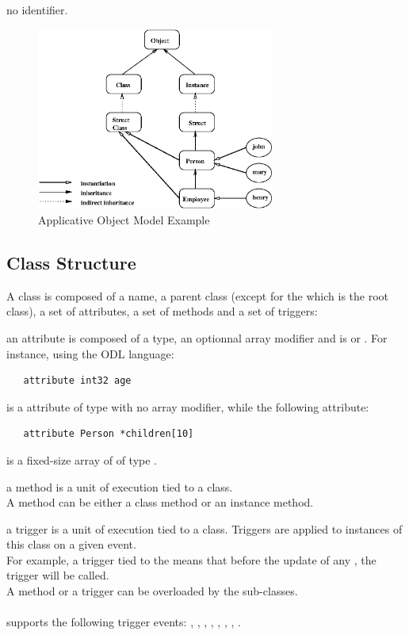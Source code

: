 no identifier.
\ei
\begin{figure}[!th]
\centering
\includegraphics[height=60mm]{figures/objmod2.eps}
\caption{Applicative Object Model Example}
\label{objmod2}
\end{figure}
\subsection{Class Structure}
A class is composed of a name, a parent class (except for the
 which is the root class), a set
of attributes, a set of methods and a set of triggers:
\bi
\item an attribute is composed of a type, an optionnal array modifier and
is  or . For instance, using the \eyedb ODL
language:
{\verbsize
\begin{verbatim}
   attribute int32 age
\end{verbatim}
}
is a  attribute of type  with no array modifier,
while the following attribute:
{\verbsize
\begin{verbatim}
   attribute Person *children[10]
\end{verbatim}
}
is a fixed-size array of  of type .

\item a method is a unit of execution tied to a class.
\\
A method can be either a class method or an instance method.
\item a trigger is a unit of execution tied to a class.
Triggers are applied to instances of this class on a given event.
\\
For example, a trigger  tied to the 
means that before the update of any , the trigger will
be called.
\\
A method or a trigger can be overloaded by the sub-classes.
\\
\\
\eyedb supports the following trigger events: ,
,
,
,
,
,
,
.
\ei
